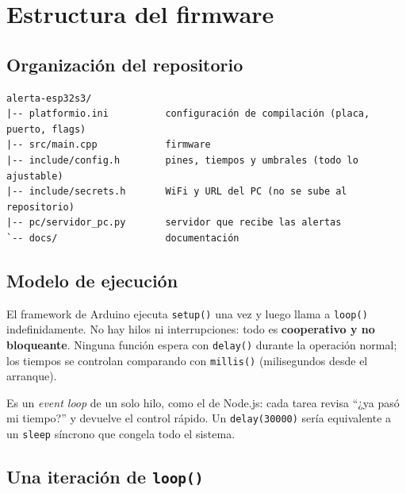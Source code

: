 \documentclass[11pt,a4paper]{article}
\begin{document}
\section{Estructura del firmware}

\subsection{Organización del repositorio}

\begin{lstlisting}[numbers=none,language={}]
alerta-esp32s3/
|-- platformio.ini          configuración de compilación (placa, puerto, flags)
|-- src/main.cpp            firmware
|-- include/config.h        pines, tiempos y umbrales (todo lo ajustable)
|-- include/secrets.h       WiFi y URL del PC (no se sube al repositorio)
|-- pc/servidor_pc.py       servidor que recibe las alertas
`-- docs/                   documentación
\end{lstlisting}

\subsection{Modelo de ejecución}

El framework de Arduino ejecuta \texttt{setup()} una vez y luego llama a \texttt{loop()}
indefinidamente. No hay hilos ni interrupciones: todo es \textbf{cooperativo y no
bloqueante}. Ninguna función espera con \texttt{delay()} durante la operación normal;
los tiempos se controlan comparando con \texttt{millis()} (milisegundos desde el
arranque).

\begin{analogia}[millis()]
Es un \emph{event loop} de un solo hilo, como el de Node.js: cada tarea revisa
``¿ya pasó mi tiempo?'' y devuelve el control rápido. Un \texttt{delay(30000)} sería
equivalente a un \texttt{sleep} síncrono que congela todo el sistema.
\end{analogia}

\subsection{Una iteración de \texttt{loop()}}
\end{document}
